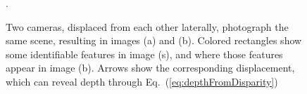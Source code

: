 \begin{figure}
\centerline{
}
\caption{Two cameras, displaced from each other laterally, photograph the same scene, resulting in images (a) and (b).  Colored rectangles show some identifiable features in image (s), and where those features appear in image (b).  Arrows show the corresponding displacement, which can reveal depth through Eq.~(\ref{eq:depthFromDisparity})}.
\label{fig:stereomatch}
\end{figure}

